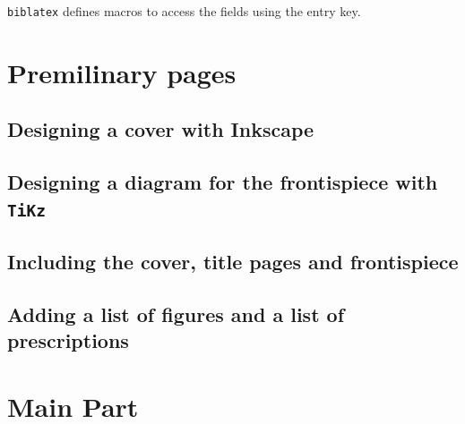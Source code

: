 \documentclass[12pt,a4,oneside,usenames,dvipsnames]{book}
\newcommand\biblatex{\texttt{biblatex}\xspace}%
\begin{document}
\biblatex defines macros to access the fields using the entry key.

\skelpar
%
\begin{figure}{\centering%
%
\skelcaption[width=0.2\textwidth,lines=1]{}}
\end{figure}{}

\part{Premilinary pages}

\chapter{Designing a cover with Inkscape}
%
\begin{figure}{\centering%
%
\skelcaption[width=0.2\textwidth,lines=1]{}}
\end{figure}{}
%
\begin{figure}{\centering%
%
\skelcaption[width=0.2\textwidth,lines=1]{}}
\end{figure}{}

\chapter{Designing a diagram for the frontispiece with \texttt{TiKz}}
%
\begin{figure}{\centering%
%
\skelcaption[width=0.2\textwidth,lines=1]{}}
\end{figure}{}

\chapter{Including the cover, title pages and frontispiece}

\chapter{Adding a list of figures and a list of prescriptions}
%
\begin{figure}{\centering%
%
\skelcaption[width=0.2\textwidth,lines=1]{}}
\end{figure}{}

\part{Main Part}
\end{document}

